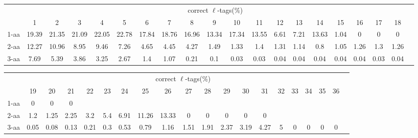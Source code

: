 \documentclass{article}[12pt]
\begin{document}
\begin{landscape}

\begin{table}[h]\tiny
\vspace{3mm}
{\centering
\begin{center}
\begin{tabular}{|l|c|c|c|c|c|c|c|c|c|c|c|c|c|c|c|c|c|c|c|}
  \hline
  & \multicolumn{ 18 }{|c|}{correct $\ell$-tags(\%)} \\
  \cline{2- 19}
    & 1 & 2 & 3 & 4 & 5 & 6 & 7 & 8 & 9 & 10 & 11 & 12 & 13 & 14 & 15 & 16 & 17 & 18\\
  \hline
1-aa  & 19.39 & 21.35 & 21.09 & 22.05 & 22.78 & 17.84 & 18.76 & 16.96 & 13.34 & 17.34 & 13.55 & 6.61 & 7.21 & 13.63 & 1.04 & 0 & 0 & 0\\
2-aa  & 12.27 & 10.96 & 8.95 & 9.46 & 7.26 & 4.65 & 4.45 & 4.27 & 1.49 & 1.33 & 1.4 & 1.31 & 1.14 & 0.8 & 1.05 & 1.26 & 1.3 & 1.26\\
3-aa  & 7.69 & 5.39 & 3.86 & 3.25 & 2.67 & 1.4 & 1.07 & 0.21 & 0.1 & 0.03 & 0.03 & 0.04 & 0.04 & 0.04 & 0.04 & 0.04 & 0.03 & 0.04\\
 \hline
\end{tabular}
\end{center}
\par}
\centering

\vspace{3mm}
\end{table}
\begin{table}[h]\tiny
\vspace{3mm}
{\centering
\begin{center}
\begin{tabular}{|l|c|c|c|c|c|c|c|c|c|c|c|c|c|c|c|c|c|c|c|}
  \hline
  & \multicolumn{ 18 }{|c|}{correct $\ell$-tags(\%)} \\
  \cline{2- 19}
    & 19 & 20 & 21 & 22 & 23 & 24 & 25 & 26 & 27 & 28 & 29 & 30 & 31 & 32 & 33 & 34 & 35 & 36\\
  \hline
1-aa  & 0 & 0 & 0 &  &  &  &  &  &  &  &  &  &  &  &  &  &  & \\
2-aa  & 1.2 & 1.25 & 2.25 & 3.2 & 5.4 & 6.91 & 11.26 & 13.33 & 0 & 0 & 0 & 0 & 0 &  &  &  &  & \\
3-aa  & 0.05 & 0.08 & 0.13 & 0.21 & 0.3 & 0.53 & 0.79 & 1.16 & 1.51 & 1.91 & 2.37 & 3.19 & 4.27 & 5 & 0 & 0 & 0 & 0\\
 \hline
\end{tabular}
\end{center}
\par}
\centering


\end{table}
\end{landscape}
\end{document}
